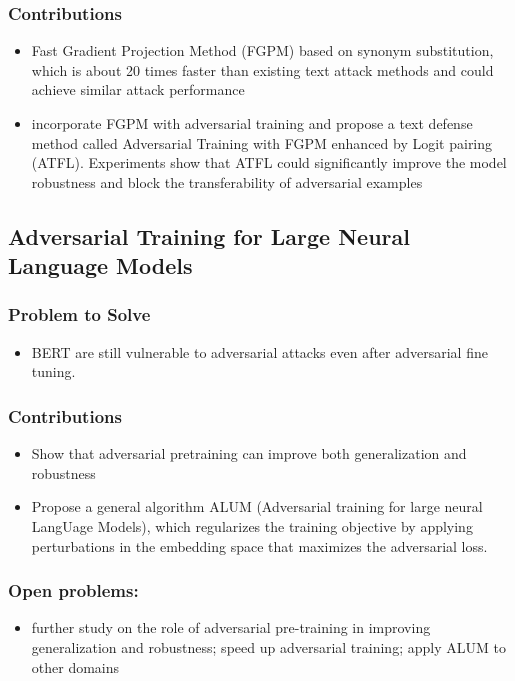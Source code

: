 \documentclass{article}
\begin{document}
\begin{flushleft}
\subsubsection*{Contributions}
\begin{itemize}
  \item Fast Gradient Projection Method (FGPM) based on synonym substitution, which is about 20 times faster than existing text attack methods and could achieve similar attack performance
  \item incorporate FGPM with adversarial training and propose a text defense method called Adversarial Training with FGPM enhanced by Logit pairing (ATFL). Experiments show that ATFL could significantly improve the model robustness and block the transferability of adversarial examples
\end{itemize}


 



\subsection{ Adversarial Training for Large Neural Language Models \cite{liu2020adversarial}} 
\subsubsection*{Problem to Solve}
\begin{itemize}
    \item BERT are still vulnerable to adversarial attacks even after adversarial fine tuning.
\end{itemize}

\subsubsection*{Contributions}
\begin{itemize}
 \item Show that adversarial pretraining can improve both generalization and robustness
\item Propose a general algorithm ALUM (Adversarial training for large neural LangUage Models), which regularizes the training objective by applying perturbations in the embedding space that maximizes the adversarial loss.
\end{itemize}

\subsubsection*{Open problems:}
\begin{itemize}
  \item  further study on the role of adversarial pre-training in improving generalization and robustness; speed up adversarial training; apply ALUM to other domains
\end{itemize}




\end{flushleft}
\end{document}
